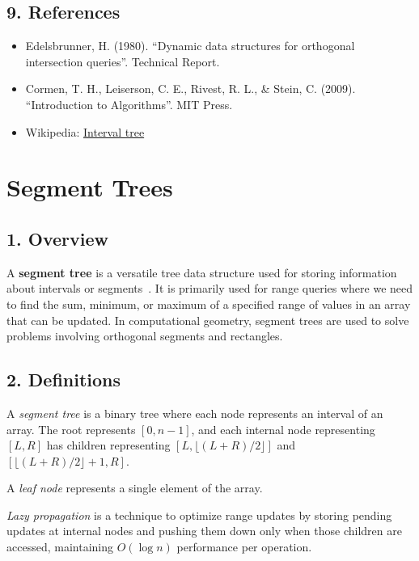 \subsection{9. References}
\begin{itemize}
    \item Edelsbrunner, H. (1980). ``Dynamic data structures for orthogonal intersection queries''. Technical Report.
    \item Cormen, T. H., Leiserson, C. E., Rivest, R. L., \& Stein, C. (2009). ``Introduction to Algorithms''. MIT Press.
    \item Wikipedia: \href{https://en.wikipedia.org/wiki/Interval_tree}{Interval tree}
\end{itemize}

\section{Segment Trees}
\label{sec:segment_tree}

\subsection{1. Overview}
A \textbf{segment tree} is a versatile tree data structure used for storing information about intervals or segments~\cite{bentley1977}. It is primarily used for range queries where we need to find the sum, minimum, or maximum of a specified range of values in an array that can be updated. In computational geometry, segment trees are used to solve problems involving orthogonal segments and rectangles.

\subsection{2. Definitions}
\begin{definition}
\label{def:st_segment_tree}
A \emph{segment tree} is a binary tree where each node represents an interval of an array. The root represents $[0, n-1]$, and each internal node representing $[L, R]$ has children representing $[L, \lfloor(L+R)/2\rfloor]$ and $[\lfloor(L+R)/2\rfloor+1, R]$.
\end{definition}

\begin{definition}
\label{def:st_leaf}
A \emph{leaf node} represents a single element of the array.
\end{definition}

\begin{definition}
\label{def:st_lazy}
\emph{Lazy propagation} is a technique to optimize range updates by storing pending updates at internal nodes and pushing them down only when those children are accessed, maintaining $O(\log n)$ performance per operation.
\end{definition}

